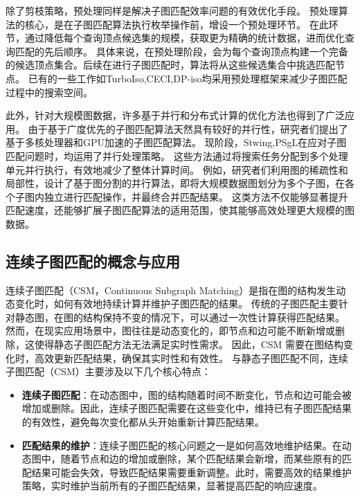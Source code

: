 除了剪枝策略，预处理同样是解决子图匹配效率问题的有效优化手段。 
预处理算法的核心，是在子图匹配算法执行枚举操作前，增设一个预处理环节。
在此环节，通过降低每个查询顶点候选集的规模，获取更为精确的统计数据，进而优化查询匹配的先后顺序。
具体来说，在预处理阶段，会为每个查询顶点构建一个完备的候选顶点集合。后续在进行子图匹配时，算法将从这些候选集合中挑选匹配节点。
已有的一些工作如TurboIso\cite{sm-turbo-iso-DBLP:conf/sigmod/HanLL13},CECI\cite{sm-ceci-DBLP:conf/sigmod/BhattaraiLH19},DP-iso\cite{sm-dp-iso-DBLP:conf/sigmod/HanKGPH19}均采用预处理框架来减少子图匹配过程中的搜索空间。

此外，针对大规模图数据，许多基于并行和分布式计算的优化方法也得到了广泛应用。
由于基于广度优先的子图匹配算法天然具有较好的并行性，研究者们提出了基于多核处理器和GPU加速的子图匹配算法。
现阶段，Stwing\cite{sm-stwing-DBLP:journals/pvldb/SunWWSL12},PSgL\cite{sm-psgl-DBLP:conf/sigmod/ShaoCCMYX14}在应对子图匹配问题时，均运用了并行处理策略。
这些方法通过将搜索任务分配到多个处理单元并行执行，有效地减少了整体计算时间。
例如，研究者们利用图的稀疏性和局部性，设计了基于图分割的并行算法，即将大规模数据图划分为多个子图，在各个子图内独立进行匹配操作，并最终合并匹配结果。
这类方法不仅能够显著提升匹配速度，还能够扩展子图匹配算法的适用范围，使其能够高效处理更大规模的图数据。


\subsection{连续子图匹配的概念与应用}
\label{csm-concept}
连续子图匹配（CSM，Continuous Subgraph Matching）是指在图的结构发生动态变化时，如何有效地持续计算并维护子图匹配的结果\cite{wang2023survey}。
传统的子图匹配主要针对静态图，在图的结构保持不变的情况下，可以通过一次性计算获得匹配结果。
然而，在现实应用场景中，图往往是动态变化的，即节点和边可能不断新增或删除，这使得静态子图匹配方法无法满足实时性需求。
因此，CSM 需要在图结构变化时，高效更新匹配结果，确保其实时性和有效性。
与静态子图匹配不同，连续子图匹配（CSM）主要涉及以下几个核心特点：
\begin{itemize}
   \item \textbf{连续子图匹配}：在动态图中，图的结构随着时间不断变化，节点和边可能会被增加或删除。因此，连续子图匹配需要在这些变化中，维持已有子图匹配结果的有效性，避免每次变化都从头开始重新计算匹配结果。
   \item \textbf{匹配结果的维护}：连续子图匹配的核心问题之一是如何高效地维护结果。在动态图中，随着节点和边的增加或删除，某个匹配结果会新增，而某些原有的匹配结果可能会失效，导致匹配结果需要重新调整。此时，需要高效的结果维护策略，实时维护当前所有的子图匹配结果，显著提高匹配的响应速度。
\end{itemize}

